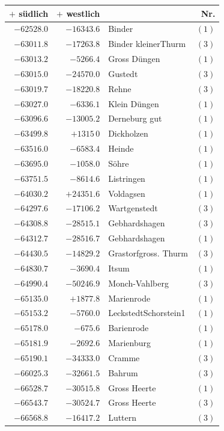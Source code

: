 \clearpage{}%
\begin{center}\begingroup\fontsize{8}{9}\selectfont
\setlength{\tabcolsep}{4pt}
\begin{tabular}{r|r|p{170pt}|r}\hline
\(+\) südlich&\(+\) westlich&&Nr.\\\hline
\(-62528.0\)&\(-16343.6\)&Binder&\((1)\)\\
\(-63011.8\)&\(-17263.8\)&Binder kleinerThurm&\((3)\)\\
\(-63013.2\)&\(-5266.4\)&Gross Düngen&\((1)\)\\
\(-63015.0\)&\(-24570.0\)&Gustedt&\((3)\)\\
\(-63019.7\)&\(-18220.8\)&Rehne&\((3)\)\\
\(-63027.0\)&\(-6336.1\)&Klein Düngen&\((1)\)\\
\(-63096.6\)&\(-13005.2\)&Derneburg gut&\((1)\)\\
\(-63499.8\)&\(+1315\,0\)&Dickholzen&\((1)\)\\
\(-63516.0\)&\(-6583.4\)&Heinde&\((1)\)\\
\(-63695.0\)&\(-1058.0\)&Söhre&\((1)\)\\
\(-63751.5\)&\(-8614.6\)&Listringen&\((1)\)\\
\(-64030.2\)&\(+24351.6\)&Voldagsen&\((1)\)\\
\(-64297.6\)&\(-17106.2\)&Wartgenstedt&\((3)\)\\
\(-64308.8\)&\(-28515.1\)&Gebhardshagen&\((3)\)\\
\(-64312.7\)&\(-28516.7\)&Gebhardshagen&\((1)\)\\
\(-64430.5\)&\(-14829.2\)&Grastorfgross. Thurm&\((3)\)\\
\(-64830.7\)&\(-3690.4\)&Itsum&\((1)\)\\
\(-64990.4\)&\(-50246.9\)&Monch-Vahlberg&\((3)\)\\
\(-65135.0\)&\(+1877.8\)&Marienrode&\((1)\)\\
\(-65153.2\)&\(-5760.0\)&LeckstedtSchorstein1&\((1)\)\\
\(-65178.0\)&\(-675.6\)&Barienrode&\((1)\)\\
\(-65181.9\)&\(-2692.6\)&Marienburg&\((1)\)\\
\(-65190.1\)&\(-34333.0\)&Cramme&\((3)\)\\
\(-66025.3\)&\(-32661.5\)&Bahrum&\((3)\)\\
\(-66528.7\)&\(-30515.8\)&Gross Heerte&\((1)\)\\
\(-66543.7\)&\(-30524.7\)&Gross Heerte&\((3)\)\\
\(-66568.8\)&\(-16417.2\)&Luttern&\((3)\)\\

\end{tabular}
\end{center}

